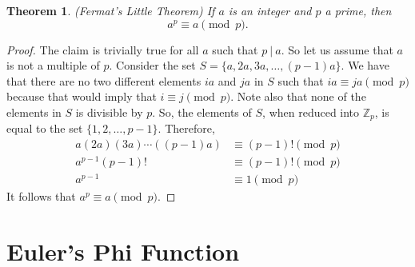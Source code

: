 \documentclass{article}
\newtheorem{theorem}[lemma]{Theorem}
\newcommand{\divides}{\ |\ }
\begin{document}
\begin{itemize}
\begin{theorem} (Fermat's Little Theorem)
If $a$ is an integer and $p$ a prime, then $$a^p \equiv a \pmod p.$$
\end{theorem}
\begin{proof}
The claim is trivially true for all $a$ such that $p \divides a$. So let us assume that $a$ is not a multiple of $p$. Consider the set $S = \{a, 2a, 3a, \dotsc, (p-1)a \}$. We have that there are no two different elements $ia$ and $ja$ in $S$ such that $ia \equiv ja \pmod p$ because that would imply that $i \equiv j \pmod p$. Note also that none of the elements in $S$ is divisible by $p$. So, the elements of $S$, when reduced into $\mathbb{Z}_p$, is equal to the set $\{1, 2, \dotsc, p-1\}$. Therefore,
\begin{align*}
a(2a)(3a)\dotsm((p-1)a) &\equiv (p-1)! \pmod p\\
a^{p-1}(p-1)! &\equiv (p-1)! \pmod p\\
a^{p-1} &\equiv 1 \pmod p
\end{align*}
It follows that $a^p \equiv a \pmod p$.
\end{proof}
\end{itemize}

  \section{Euler's Phi Function} %
  \label{sec:euler_s_phi_function}
    
\end{document}
